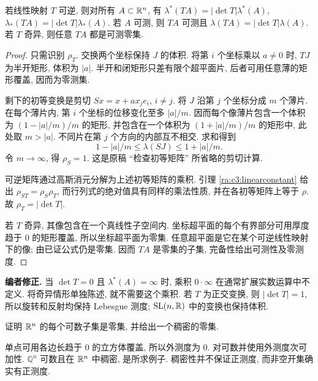 \begin{theorem}\label{ra:c3:determinant}
若线性映射 $T$ 可逆, 则对所有 $A\subset\mathbb R^n$, 有 $\lambda^*(TA)=|\det T|\lambda^*(A)$, $\lambda_*(TA)=|\det T|\lambda_*(A)$. 若 $A$ 可测, 则 $TA$ 可测且 $\lambda(TA)=|\det T|\lambda(A)$. 若 $T$ 奇异, 则任意 $TA$ 都是可测零集.
\end{theorem}
\begin{proof}
只需识别 $\rho_T$. 交换两个坐标保持 $J$ 的体积. 将第 $i$ 个坐标乘以 $a\ne0$ 时, $TJ$ 为半开矩形, 体积为 $|a|$. 半开和闭矩形只差有限个超平面片, 后者可用任意薄的矩形覆盖, 因而为零测集.

剩下的初等变换是剪切 $Sx=x+a x_j e_i$, $i\ne j$. 将 $J$ 沿第 $j$ 个坐标分成 $m$ 个薄片. 在每个薄片内, 第 $i$ 个坐标的位移变化至多 $|a|/m$. 因而每个像薄片包含一个体积为 $(1-|a|/m)/m$ 的矩形, 并包含在一个体积为 $(1+|a|/m)/m$ 的矩形中, 此处取 $m>|a|$. 不同片在第 $j$ 个方向的内部互不相交. 求和得到
\[
 1-|a|/m\le\lambda(SJ)\le1+|a|/m.
\]
令 $m\to\infty$, 得 $\rho_S=1$. 这是原稿 ``检查初等矩阵'' 所省略的剪切计算.

可逆矩阵通过高斯消元分解为上述初等矩阵的乘积. 引理 \ref{ra:c3:linearconstant} 给出 $\rho_{ST}=\rho_S\rho_T$, 而行列式的绝对值具有同样的乘法性质, 并在各初等矩阵上等于 $\rho$. 故 $\rho_T=|\det T|$.

若 $T$ 奇异, 其像包含在一个真线性子空间内. 坐标超平面的每个有界部分可用厚度趋于 $0$ 的矩形覆盖, 所以坐标超平面为零集. 任意超平面是它在某个可逆线性映射下的像; 由已证公式仍是零集. 因而 $TA$ 是零集的子集, 完备性给出可测性及零测度.
\end{proof}

\begin{remark}
\textbf{编者修正.} 当 $\det T=0$ 且 $\lambda^*(A)=\infty$ 时, 乘积 $0\cdot\infty$ 在通常扩展实数运算中不定义. 将奇异情形单独陈述, 就不需要这个乘积. 若 $T$ 为正交变换, 则 $|\det T|=1$, 所以旋转和反射均保持 Lebesgue 测度; $\mathrm{SL}(n,\mathbb R)$ 中的变换也保持体积.
\end{remark}


\begin{exercise}
证明 $\mathbb R^n$ 的每个可数子集是零集, 并给出一个稠密的零集.
\end{exercise}
\begin{solution}
单点可用各边长趋于 $0$ 的立方体覆盖, 所以外测度为 $0$. 对可数并使用外测度次可加性. $\mathbb Q^n$ 可数且在 $\mathbb R^n$ 中稠密, 是所求例子. 稠密性并不保证正测度, 而非空开集确实有正测度.
\end{solution}

